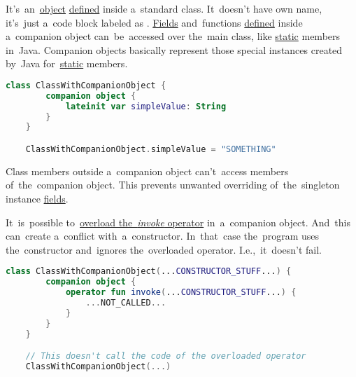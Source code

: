 \label{kotlincompanionobject}
It's~an~\hyperref[kotlinobject]{object} \hyperref[declarationdefinition]{defined} inside a~standard class.
It~doesn't have own name, it's~just a~code block labeled as .
\hyperref[variablefieldproperty]{Fields} and~functions \hyperref[declarationdefinition]{defined} inside a~companion object can~be~accessed over the~main class, like \hyperref[javastatic]{static} members in~Java.
Companion objects basically represent those special instances created by~Java for~\hyperref[javastatic]{static} members.

\begin{lstlisting}[language=Kotlin]
    class ClassWithCompanionObject {
        companion object {
            lateinit var simpleValue: String
        }
    }

    ClassWithCompanionObject.simpleValue = "SOMETHING"
\end{lstlisting}

\note Class members outside a~companion object can't~access members of~the~companion object.
This prevents unwanted overriding of~the~singleton instance \hyperref[variablefieldproperty]{fields}.
\newpage

It~is~possible to~\hyperref[kotlininvokeoverload]{overload \mbox{the \textit{invoke}} operator} in~a~companion object.
And~this can~create a~conflict with~a~constructor.
In~that~case the~program uses the~constructor and~ignores the~overloaded operator.
I.e.,~it~doesn't fail.

\begin{lstlisting}[language=Kotlin]
    class ClassWithCompanionObject(...CONSTRUCTOR_STUFF...) {
        companion object {
            operator fun invoke(...CONSTRUCTOR_STUFF...) {
                ...NOT_CALLED...
            }
        }
    }

    // This doesn't call the code of the overloaded operator
    ClassWithCompanionObject(...)
\end{lstlisting}
